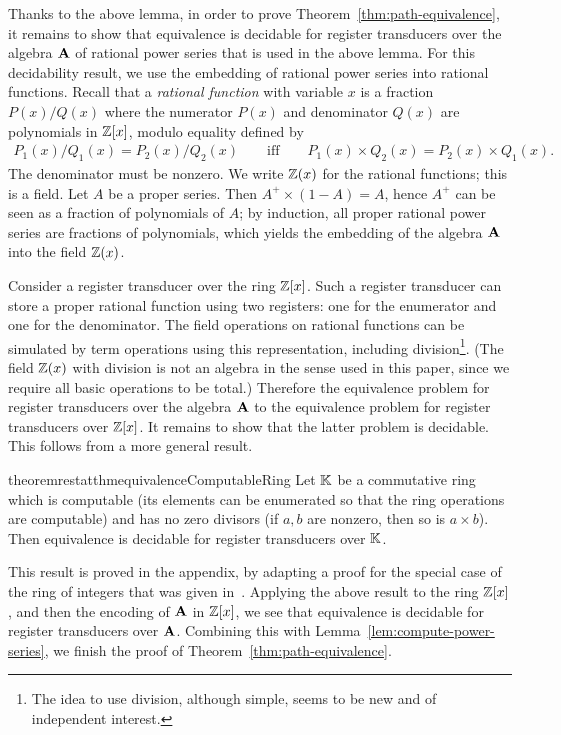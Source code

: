 Thanks to the above lemma, in order to prove Theorem~\ref{thm:path-equivalence}, it remains to show that equivalence is decidable for register transducers over the algebra $\mathbf{A}$ of rational power series that is used in the above lemma.  For this decidability result, we use the embedding of rational power series into rational functions. 
Recall that a \emph{rational function} with variable $x$ is a fraction $P(x)/Q(x)$ 
where  the numerator $P(x)$ and denominator $Q(x)$ are polynomials in $\mathbb Z[x]$, modulo equality defined by 
\begin{align*}
P_1(x)/Q_1(x) = P_2(x)/Q_2(x) \qquad \text{iff} \qquad P_1(x) \times Q_2(x) = P_2(x) \times Q_1(x).
\end{align*}
The denominator must be nonzero. 
We write $\mathbb Z(x)$ for the rational functions; this is a field. Let $A$ be a proper series. Then $A^+ \times (1-A) = A$, hence $A^+$ can be seen as a fraction of polynomials of $A$; by induction, all proper rational power series  are fractions of polynomials, which yields the embedding of the algebra $\mathbf{A}$ into the field $\mathbb Z(x)$.  

Consider a register transducer over the ring $\mathbb Z[x]$. Such a register transducer can store a proper rational function using two registers: one for the enumerator and one for the denominator. The field operations on rational functions can be simulated by term operations using this representation, including  division\footnote{The idea to use  division, although simple, seems to be new and of independent interest.}. (The field  $\mathbb Z(x)$ with division is not  an algebra in the sense used in this paper, since we require all basic operations  to be total.) Therefore the equivalence problem for register transducers over the algebra $\mathbf{A}$ to the equivalence problem for register transducers over $\mathbb Z[x]$. It remains to show that the latter problem is decidable. This follows from a more general result.

\begin{restatable}{theoremrestat}{thmequivalenceComputableRing}\label{thm:equivalence-for-computable-ring}
    Let ${\mathbb K}$ be a commutative ring which is computable (its elements can be enumerated so that the ring operations are computable) and has no zero divisors (if $a,b$ are nonzero, then so is $a \times b$). Then equivalence is decidable for register transducers over ${\mathbb K}$.
\end{restatable}
This result is proved in the appendix, by adapting a proof for the special case of the ring of integers that was given in~\cite[Theorem 6.6]{seidlManethKemper2018}. 
Applying the above result to the ring $\mathbb Z[x]$, and then the encoding of $\mathbf{A}$ in $\mathbb Z[x]$, we see that equivalence is decidable for register transducers over $\mathbf{A}$. Combining this with Lemma~\ref{lem:compute-power-series}, we finish the proof of Theorem~\ref{thm:path-equivalence}.


